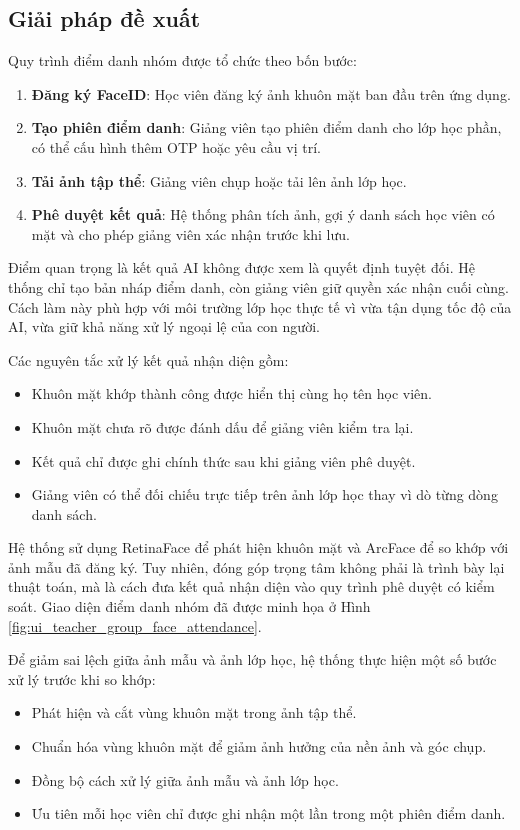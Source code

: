 \documentclass[../DoAn.tex]{subfiles}
\begin{document}
\subsection{Giải pháp đề xuất}
Quy trình điểm danh nhóm được tổ chức theo bốn bước:
\begin{enumerate}
    \item \textbf{Đăng ký FaceID}: Học viên đăng ký ảnh khuôn mặt ban đầu trên ứng dụng.
    \item \textbf{Tạo phiên điểm danh}: Giảng viên tạo phiên điểm danh cho lớp học phần, có thể cấu hình thêm OTP hoặc yêu cầu vị trí.
    \item \textbf{Tải ảnh tập thể}: Giảng viên chụp hoặc tải lên ảnh lớp học.
    \item \textbf{Phê duyệt kết quả}: Hệ thống phân tích ảnh, gợi ý danh sách học viên có mặt và cho phép giảng viên xác nhận trước khi lưu.
\end{enumerate}

Điểm quan trọng là kết quả AI không được xem là quyết định tuyệt đối. Hệ thống chỉ tạo bản nháp điểm danh, còn giảng viên giữ quyền xác nhận cuối cùng. Cách làm này phù hợp với môi trường lớp học thực tế vì vừa tận dụng tốc độ của AI, vừa giữ khả năng xử lý ngoại lệ của con người.

Các nguyên tắc xử lý kết quả nhận diện gồm:
\begin{itemize}
    \item Khuôn mặt khớp thành công được hiển thị cùng họ tên học viên.
    \item Khuôn mặt chưa rõ được đánh dấu để giảng viên kiểm tra lại.
    \item Kết quả chỉ được ghi chính thức sau khi giảng viên phê duyệt.
    \item Giảng viên có thể đối chiếu trực tiếp trên ảnh lớp học thay vì dò từng dòng danh sách.
\end{itemize}

Hệ thống sử dụng RetinaFace \cite{Deng_2020_CVPR} để phát hiện khuôn mặt và ArcFace \cite{Deng_2019_CVPR} để so khớp với ảnh mẫu đã đăng ký. Tuy nhiên, đóng góp trọng tâm không phải là trình bày lại thuật toán, mà là cách đưa kết quả nhận diện vào quy trình phê duyệt có kiểm soát. Giao diện điểm danh nhóm đã được minh họa ở Hình \ref{fig:ui_teacher_group_face_attendance}.

Để giảm sai lệch giữa ảnh mẫu và ảnh lớp học, hệ thống thực hiện một số bước xử lý trước khi so khớp:
\begin{itemize}
    \item Phát hiện và cắt vùng khuôn mặt trong ảnh tập thể.
    \item Chuẩn hóa vùng khuôn mặt để giảm ảnh hưởng của nền ảnh và góc chụp.
    \item Đồng bộ cách xử lý giữa ảnh mẫu và ảnh lớp học.
    \item Ưu tiên mỗi học viên chỉ được ghi nhận một lần trong một phiên điểm danh.
\end{itemize}
\end{document}
